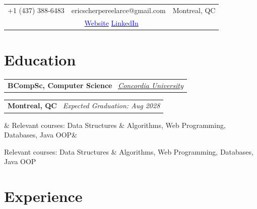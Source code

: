 \documentclass[10pt,a4paper,sans]{moderncv}
\makeatletter
\newcommand*{\customcventry}[7][.13em]{
\begin{tabular}{@{}l}
{\bfseries #4} \
{\itshape #3}
\end{tabular}
\hfill
\begin{tabular}{l@{}}
{\bfseries #5} \
{\itshape #2}
\end{tabular}
\ifx&#7&%
\else
{%
\begin{minipage}{\maincolumnwidth}%
\raggedright
#7%
\end{minipage}%
}%
\fi
\par\addvspace{#1}}
\makeatother
\begin{document}
\makecvtitle



\fontsize{10.55}{12.6}\selectfont
\vspace*{-12mm}

\begin{center}
\begin{tabular}{ c c c }
\faMobile\enspace +1 (437) 388-6483 \quad \quad &
\faEnvelope\enspace ericscherpereelarce@gmail.com \quad \quad &
\faHome\enspace Montreal, QC \\

\multicolumn{3}{c}{%
\faGlobe\enspace \href{https://ericscherpereel.netlify.app/}{\textcolor{blue}{Website}}
\quad \quad
\faLinkedin\enspace \href{https://www.linkedin.com/in/eric-scherpereel-arce-191422327/}{\textcolor{blue}{LinkedIn}}
} \\
\end{tabular}
\end{center}




\section{Education}


\customcventry{Expected Graduation: Aug 2028}{{\color{blue}\href{https://www.concordia.ca/}{Concordia University}}}{BCompSc, Computer Science}{Montreal, QC}{}{
{Relevant courses: Data Structures \& Algorithms, Web Programming, Databases, Java OOP\linebreak}}





\section{Experience}
\end{document}
